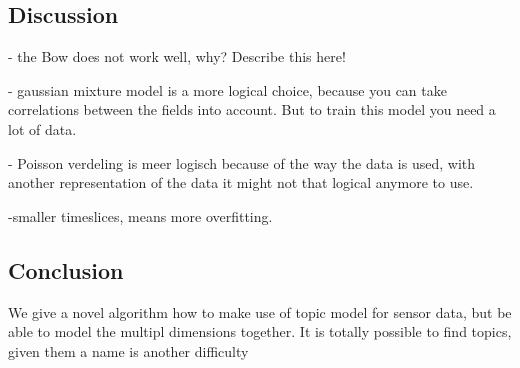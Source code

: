\documentclass[11pt,a4paper]{article}
\begin{document}
\subsection{Discussion}
- the Bow does not work well, why? Describe this here!

- gaussian mixture model is a more logical choice, because you can take correlations between the fields into account. But to train this model you need a lot of data.

- Poisson verdeling is meer logisch because of the way the data is used, with another representation of the data it might not that logical anymore to use.

-smaller timeslices, means more overfitting.

\subsection{Conclusion}
We give a novel algorithm how to make use of topic model for sensor data, but be able to model the multipl dimensions together.
It is totally possible to find topics, given them a name is another difficulty

\appendix

{}

\end{document}
